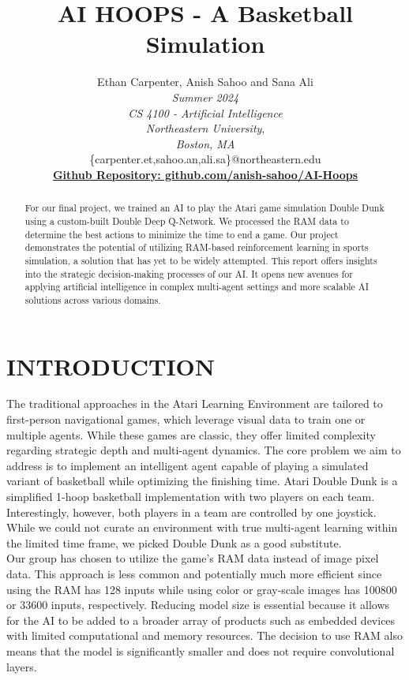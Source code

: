 \documentclass[letterpaper, 10 pt, conference]{ieeeconf}
\title{\LARGE \bf
AI HOOPS - A Basketball Simulation\\
}
\author{Ethan Carpenter, Anish Sahoo and Sana Ali\\
\textit{Summer 2024}\\
\textit{CS 4100 - Artificial Intelligence}\\
\textit{Northeastern University},\\
\textit{Boston, MA}\\
\{carpenter.et,sahoo.an,ali.sa\}@northeastern.edu \\
\href{https://github.com/anish-sahoo/AI-Hoops}{\textbf{Github Repository: github.com/anish-sahoo/AI-Hoops}} \\
}
\begin{document}
\maketitle
\thispagestyle{empty}
\pagestyle{empty}

\begin{abstract}
For our final project, we trained an AI to play the Atari game simulation Double Dunk using a custom-built Double Deep Q-Network. We processed the RAM data to determine the best actions to minimize the time to end a game. Our project demonstrates the potential of utilizing RAM-based reinforcement learning in sports simulation, a solution that has yet to be widely attempted. This report offers insights into the strategic decision-making processes of our AI. It opens new avenues for applying artificial intelligence in complex multi-agent settings and more scalable AI solutions across various domains.\\

\end{abstract} 

\section{\textbf{INTRODUCTION}}
\vspace{.5cm}
The traditional approaches in the Atari Learning Environment are tailored to first-person navigational games, which leverage visual data to train one or multiple agents. While these games are classic, they offer limited complexity regarding strategic depth and multi-agent dynamics. The core problem we aim to address is to implement an intelligent agent capable of playing a simulated variant of basketball while optimizing the finishing time. Atari Double Dunk is a simplified 1-hoop basketball implementation with two players on each team. Interestingly, however, both players in a team are controlled by one joystick. While we could not curate an environment with true multi-agent learning within the limited time frame, we picked Double Dunk as a good substitute.\\

Our group has chosen to utilize the game’s RAM data instead of image pixel data. This approach is less common and potentially much more efficient since using the RAM has 128 inputs while using color or gray-scale images has 100800 or 33600 inputs, respectively. Reducing model size is essential because it allows for the AI to be added to a broader array of products such as embedded devices with limited computational and memory resources. The decision to use RAM also means that the model is significantly smaller and does not require convolutional layers. \\
\end{document}

